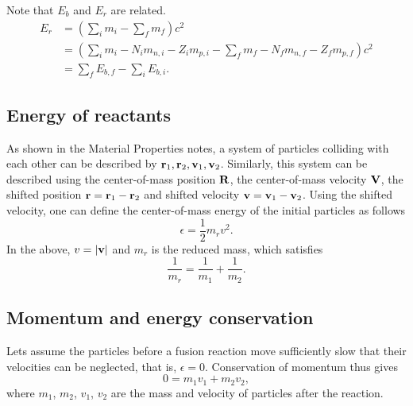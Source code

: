 \documentclass[../hedp.tex]{subfiles}
\begin{document}
Note that $E_b$ and $E_r$ are related. 
\begin{align}
    E_r &= \left ( \sum_i m_i - \sum_f m_f \right ) c^2 \nonumber \\
    &= \left ( \sum_i m_i - N_i m_{n,i} - Z_i m_{p,i} - \sum_f m_f - N_f m_{n,f} - Z_f m_{p,f}\right ) c^2 \nonumber \\
    &= \sum_f E_{b,f} - \sum_i E_{b,i}.
\end{align}

\subsection{Energy of reactants}
As shown in the Material Properties notes, a system of particles colliding with each other can be described by $\mathbf{r}_1, \mathbf{r}_2, \mathbf{v}_1, \mathbf{v}_2$. Similarly, this system can be described using the center-of-mass position $\mathbf{R}$, the center-of-mass velocity $\mathbf{V}$, the shifted position $\mathbf{r} = \mathbf{r}_1 - \mathbf{r}_2$ and shifted velocity $\mathbf{v} = \mathbf{v}_1 - \mathbf{v}_2$. Using the shifted velocity, one can define the center-of-mass energy of the initial particles as follows
\begin{equation}
    \epsilon = \frac{1}{2} m_r v^2.
\end{equation}
In the above, $v = |\mathbf{v}|$ and $m_r$ is the reduced mass, which satisfies
\begin{equation}
    \frac{1}{m_r} = \frac{1}{m_1} + \frac{1}{m_2}.
\end{equation}

\subsection{Momentum and energy conservation}
Lets assume the particles before a fusion reaction move sufficiently slow that their velocities can be neglected, that is, $\epsilon = 0$. Conservation of momentum thus gives
\begin{equation}
0 = m_1 v_1 + m_2 v_2,
\end{equation}
where $m_1$, $m_2$, $v_1$, $v_2$ are the mass and velocity of particles after the reaction.
\end{document}

